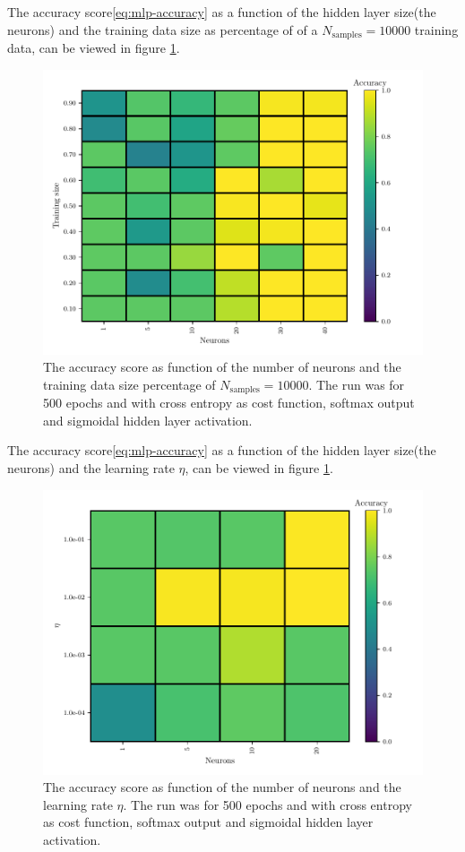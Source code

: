 The accuracy score\eqref{eq:mlp-accuracy} as a function of the hidden layer size(the neurons) and the training data size as percentage of of a $N_\mathrm{samples}=10000$ training data, can be viewed in figure \ref{fig:mlp-neurons-ts}.
\begin{figure}[H]
    \centering
    \includegraphics[scale=1.0]{../fig/mlp_neurons_training_size.pdf}
    \caption{The accuracy score as function of the number of neurons and the training data size percentage of $N_\mathrm{samples}=10000$. The run was for 500 epochs and with cross entropy as cost function, softmax output and sigmoidal hidden layer activation.}
    \label{fig:mlp-neurons-ts}
\end{figure}

The accuracy score\eqref{eq:mlp-accuracy} as a function of the hidden layer size(the neurons) and the learning rate $\eta$, can be viewed in figure \ref{fig:mlp-neurons-ts}.
\begin{figure}[H]
    \centering
    \includegraphics[scale=1.0]{../fig/mlp_neurons_eta.pdf}
    \caption{The accuracy score as function of the number of neurons and the learning rate $\eta$. The run was for 500 epochs and with cross entropy as cost function, softmax output and sigmoidal hidden layer activation.}
    \label{fig:mlp-neurons-eta}
\end{figure}

